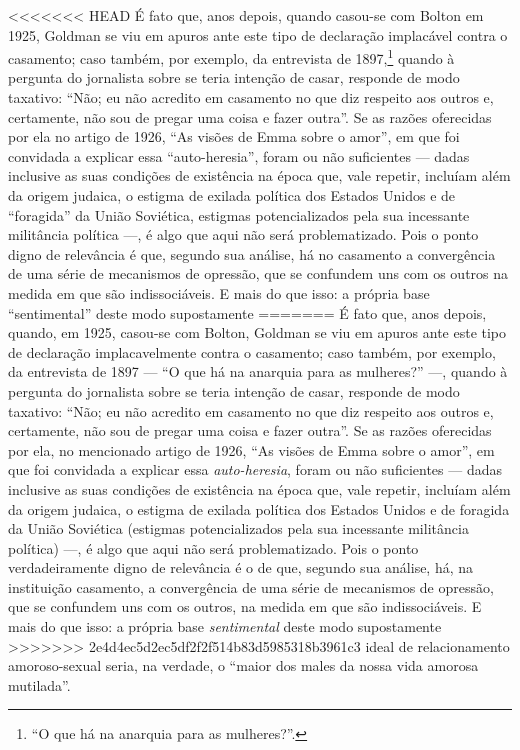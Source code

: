 {<<<<<<< HEAD
É fato que, anos depois, quando casou-se com Bolton em 1925, Goldman
se viu em apuros ante este tipo de declaração implacável contra o
casamento; caso também, por exemplo, da entrevista de 1897,\footnote{``O que há
na anarquia para as mulheres?''.} quando à pergunta do jornalista sobre
se teria intenção de casar, responde de modo taxativo: ``Não; eu não
acredito em casamento no que diz respeito aos outros e, certamente, não
sou de pregar uma coisa e fazer outra''. Se as razões oferecidas por
ela no artigo de 1926, ``As visões de Emma sobre o amor'',
em que foi convidada a explicar essa ``auto-heresia'', foram ou não
suficientes --- dadas inclusive as suas condições de existência na época
que, vale repetir, incluíam além da origem judaica, o estigma de exilada
política dos Estados Unidos e de ``foragida'' da União Soviética,
estigmas potencializados pela sua incessante militância política ---, é
algo que aqui não será problematizado. Pois o ponto
digno de relevância é que, segundo sua análise, há no
casamento a convergência de uma série de mecanismos de opressão, que se
confundem uns com os outros na medida em que são indissociáveis. E mais
do que isso: a própria base ``sentimental'' deste modo supostamente
=======
É fato que, anos depois, quando, em 1925, casou-se com Bolton, Goldman
se viu em apuros ante este tipo de declaração implacavelmente contra o
casamento; caso também, por exemplo, da entrevista de 1897 --- ``O que há
na anarquia para as mulheres?'' ---, quando à pergunta do jornalista sobre
se teria intenção de casar, responde de modo taxativo: ``Não; eu não
acredito em casamento no que diz respeito aos outros e, certamente, não
sou de pregar uma coisa e fazer outra''. Se as razões oferecidas por
ela, no mencionado artigo de 1926, ``As visões de Emma sobre o amor'',
em que foi convidada a explicar essa \textit{auto-heresia}, foram ou não
suficientes --- dadas inclusive as suas condições de existência na época
que, vale repetir, incluíam além da origem judaica, o estigma de exilada
política dos Estados Unidos e de foragida da União Soviética
(estigmas potencializados pela sua incessante militância política) ---, é
algo que aqui não será problematizado. Pois o ponto verdadeiramente
digno de relevância é o de que, segundo sua análise, há, na instituição
casamento, a convergência de uma série de mecanismos de opressão, que se
confundem uns com os outros, na medida em que são indissociáveis. E mais
do que isso: a própria base \textit{sentimental} deste modo supostamente
>>>>>>> 2e4d4ec5d2ec5df2f2f514b83d5985318b3961c3
ideal de relacionamento amoroso-sexual seria, na verdade, o ``maior dos
males da nossa vida amorosa mutilada''.

}
